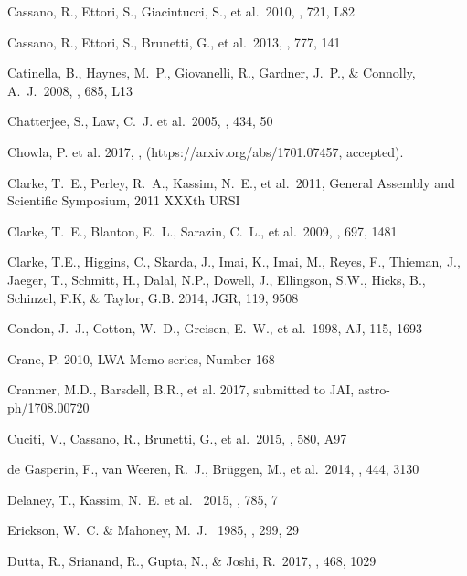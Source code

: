 \documentclass[11pt]{article}
\begin{document}
\begin{thebibliography}{}
 Cassano, R., Ettori, S., Giacintucci, S., et al.\ 2010, \apjl, 721, L82 

 Cassano, R., Ettori, S., Brunetti, G., et al.\ 2013, \apj, 777, 141 

 Catinella, B., Haynes, M.~P., Giovanelli, R., Gardner, J.~P., \& Connolly, A.~J.\ 2008, \apjl, 685, L13 

 Chatterjee, S., Law, C.~J. et al.\ 2005, \nat, 434, 50

 Chowla, P. et al. 2017, \apj, (https://arxiv.org/abs/1701.07457, accepted).

 Clarke, T.~E., Perley, R.~A., Kassim, N.~E., et al.\ 2011, General Assembly and Scientific Symposium, 2011 XXXth URSI

 Clarke, T.~E., Blanton, E.~L., Sarazin, C.~L., et al.\ 2009, \apj, 697, 1481 

Clarke, T.E., Higgins, C., Skarda, J., Imai, K., Imai, M., Reyes, F., Thieman, J., Jaeger, T., Schmitt, H., Dalal, N.P., Dowell, J., Ellingson, S.W., Hicks, B., Schinzel, F.K, \& Taylor, G.B. 2014, JGR, 119, 9508 

 Condon, J.~J., Cotton, W.~D., Greisen, E.~W., et al.\ 1998, AJ, 115, 1693 

Crane, P. 2010, LWA Memo series, Number 168

Cranmer, M.D., Barsdell, B.R.,  et al. 2017, submitted to JAI, 
astro-ph/1708.00720

 Cuciti, V., Cassano, R., Brunetti, G., et al.\ 2015, \aap, 580, A97 


 de Gasperin, F., van Weeren, R.~J., Br{\"u}ggen, M., et al.\ 2014, \mnras, 444, 3130 


 Delaney, T., Kassim, N.~E. et al. \ 2015, \apj, 785, 7 

 Erickson, W.~C. \& Mahoney, M.~J. \ 1985, \apj, 299, 29 

 Dutta, R., Srianand, R., Gupta, N., \& Joshi, R.\ 2017, \mnras, 468, 1029 



\end{thebibliography}
\end{document}
